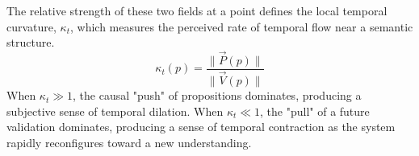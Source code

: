 The relative strength of these two fields at a point defines the local temporal curvature, \(\kappa_t\), which measures the perceived rate of temporal flow near a semantic structure.
\begin{equation}
\kappa_t(p) = \frac{\|\vec{P}(p)\|}{\|\vec{V}(p)\|}
\end{equation}
When \(\kappa_t \gg 1\), the causal "push" of propositions dominates, producing a subjective sense of temporal dilation. When \(\kappa_t \ll 1\), the "pull" of a future validation dominates, producing a sense of temporal contraction as the system rapidly reconfigures toward a new understanding. 